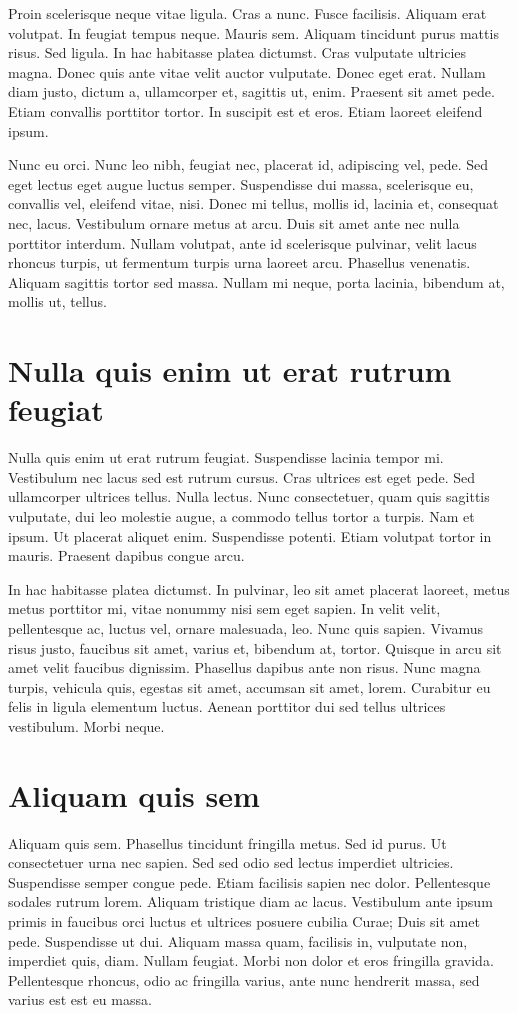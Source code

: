Proin scelerisque neque vitae ligula. Cras a nunc. Fusce
facilisis. Aliquam erat volutpat. In feugiat tempus neque. Mauris
sem. Aliquam tincidunt purus mattis risus. Sed ligula. In hac
habitasse platea dictumst. Cras vulputate ultricies magna. Donec quis
ante vitae velit auctor vulputate. Donec eget erat. Nullam diam justo,
dictum a, ullamcorper et, sagittis ut, enim. Praesent sit amet
pede. Etiam convallis porttitor tortor. In suscipit est et eros. Etiam
laoreet eleifend ipsum.

Nunc eu orci. Nunc leo nibh, feugiat nec, placerat id, adipiscing vel,
pede. Sed eget lectus eget augue luctus semper. Suspendisse dui massa,
scelerisque eu, convallis vel, eleifend vitae, nisi. Donec mi tellus,
mollis id, lacinia et, consequat nec, lacus. Vestibulum ornare metus
at arcu. Duis sit amet ante nec nulla porttitor interdum. Nullam
volutpat, ante id scelerisque pulvinar, velit lacus rhoncus turpis, ut
fermentum turpis urna laoreet arcu. Phasellus venenatis. Aliquam
sagittis tortor sed massa. Nullam mi neque, porta lacinia, bibendum
at, mollis ut, tellus.

\section{Nulla quis enim ut erat rutrum feugiat}
Nulla quis enim ut erat rutrum feugiat. Suspendisse lacinia tempor
mi. Vestibulum nec lacus sed est rutrum cursus. Cras ultrices est eget
pede. Sed ullamcorper ultrices tellus. Nulla lectus. Nunc
consectetuer, quam quis sagittis vulputate, dui leo molestie augue, a
commodo tellus tortor a turpis. Nam et ipsum. Ut placerat aliquet
enim. Suspendisse potenti. Etiam volutpat tortor in mauris. Praesent
dapibus congue arcu.

In hac habitasse platea dictumst. In pulvinar, leo sit amet placerat
laoreet, metus metus porttitor mi, vitae nonummy nisi sem eget
sapien. In velit velit, pellentesque ac, luctus vel, ornare malesuada,
leo. Nunc quis sapien. Vivamus risus justo, faucibus sit amet, varius
et, bibendum at, tortor. Quisque in arcu sit amet velit faucibus
dignissim. Phasellus dapibus ante non risus. Nunc magna turpis,
vehicula quis, egestas sit amet, accumsan sit amet, lorem. Curabitur
eu felis in ligula elementum luctus. Aenean porttitor dui sed tellus
ultrices vestibulum. Morbi neque.

\section{Aliquam quis sem}
Aliquam quis sem. Phasellus tincidunt fringilla metus. Sed id
purus. Ut consectetuer urna nec sapien. Sed sed odio sed lectus
imperdiet ultricies. Suspendisse semper congue pede. Etiam facilisis
sapien nec dolor. Pellentesque sodales rutrum lorem. Aliquam tristique
diam ac lacus. Vestibulum ante ipsum primis in faucibus orci luctus et
ultrices posuere cubilia Curae; Duis sit amet pede. Suspendisse ut
dui. Aliquam massa quam, facilisis in, vulputate non, imperdiet quis,
diam. Nullam feugiat. Morbi non dolor et eros fringilla
gravida. Pellentesque rhoncus, odio ac fringilla varius, ante nunc
hendrerit massa, sed varius est est eu massa.

